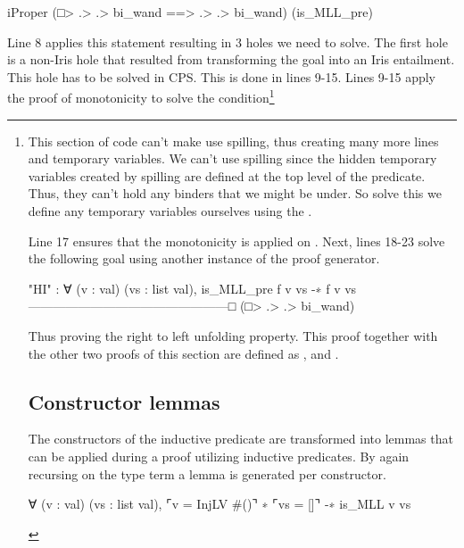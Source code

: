 \documentclass[thesis.tex]{subfiles}
\begin{document}
\begin{coqcode}
  iProper (□> .> .> bi_wand ==> .> .> bi_wand) 
          (is_MLL_pre)
\end{coqcode}
Line 8 applies this statement resulting in 3 holes we need to solve. The first hole is a non-Iris hole that resulted from transforming the goal into an Iris entailment. This hole has to be solved in CPS. This is done in lines 9-15. Lines 9-15 apply the proof of monotonicity to solve the  condition\footnote{This section of code can't make use spilling, thus creating many more lines and temporary variables. We can't use spilling since the hidden temporary variables created by spilling are defined at the top level of the predicate. Thus, they can't hold any binders that we might be under. So solve this we define any temporary variables ourselves using the .

Line 17 ensures that the monotonicity is applied on . Next, lines 18-23 solve the following goal using another instance of the  proof generator.
\begin{coqcode}
  "HI" : ∀ (v : val) (vs : list val), 
          is_MLL_pre f v vs -∗ f v vs
  ------------------------------------------------□
  (□> .> .> bi_wand)%
\end{coqcode}
Thus proving the right to left unfolding property. This proof together with the other two proofs of this section are defined as ,  and .

\section{Constructor lemmas}\label{sec:constrconstr}
The constructors of the inductive predicate are transformed into lemmas that can be applied during a proof utilizing inductive predicates. By again recursing on the type term a lemma is generated per constructor.
\begin{coqcode}
  ∀ (v : val) (vs : list val),
    ⌜v = InjLV #()⌝ ∗ ⌜vs = []⌝ -∗ is_MLL v vs


\end{coqcode}}
\end{document}
